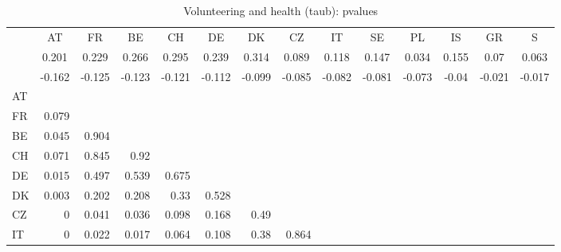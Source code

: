 \begin{table}[H]
  \centering
  \caption{Volunteering and health (taub): pvalues}
    \begin{tabular}{lrrrrrrrrrrrrr}
          & \multicolumn{1}{c}{AT} & \multicolumn{1}{c}{FR} & \multicolumn{1}{c}{BE} & \multicolumn{1}{c}{CH} & \multicolumn{1}{c}{DE} & \multicolumn{1}{c}{DK} & \multicolumn{1}{c}{CZ} & \multicolumn{1}{c}{IT} & \multicolumn{1}{c}{SE} & \multicolumn{1}{c}{PL} & \multicolumn{1}{c}{IS} & \multicolumn{1}{c}{GR} & \multicolumn{1}{c}{S} \\
          & \multicolumn{1}{c}{0.201} & \multicolumn{1}{c}{0.229} & \multicolumn{1}{c}{0.266} & \multicolumn{1}{c}{0.295} & \multicolumn{1}{c}{0.239} & \multicolumn{1}{c}{0.314} & \multicolumn{1}{c}{0.089} & \multicolumn{1}{c}{0.118} & \multicolumn{1}{c}{0.147} & \multicolumn{1}{c}{0.034} & \multicolumn{1}{c}{0.155} & \multicolumn{1}{c}{0.07} & \multicolumn{1}{c}{0.063} \\
          & \multicolumn{1}{c}{-0.162} & \multicolumn{1}{c}{-0.125} & \multicolumn{1}{c}{-0.123} & \multicolumn{1}{c}{-0.121} & \multicolumn{1}{c}{-0.112} & \multicolumn{1}{c}{-0.099} & \multicolumn{1}{c}{-0.085} & \multicolumn{1}{c}{-0.082} & \multicolumn{1}{c}{-0.081} & \multicolumn{1}{c}{-0.073} & \multicolumn{1}{c}{-0.04} & \multicolumn{1}{c}{-0.021} & \multicolumn{1}{c}{-0.017} \\
    AT    &       &       &       &       &       &       &       &       &       &       &       &       &  \\
    FR    & 0.079 &       &       &       &       &       &       &       &       &       &       &       &  \\
    BE    & 0.045 & 0.904 &       &       &       &       &       &       &       &       &       &       &  \\
    CH    & 0.071 & 0.845 & 0.92  &       &       &       &       &       &       &       &       &       &  \\
    DE    & 0.015 & 0.497 & 0.539 & 0.675 &       &       &       &       &       &       &       &       &  \\
    DK    & 0.003 & 0.202 & 0.208 & 0.33  & 0.528 &       &       &       &       &       &       &       &  \\
    CZ    & 0     & 0.041 & 0.036 & 0.098 & 0.168 & 0.49  &       &       &       &       &       &       &  \\
    IT    & 0     & 0.022 & 0.017 & 0.064 & 0.108 & 0.38  & 0.864 &       &       &       &       &       &  \\

\end{tabular}
\end{table}

